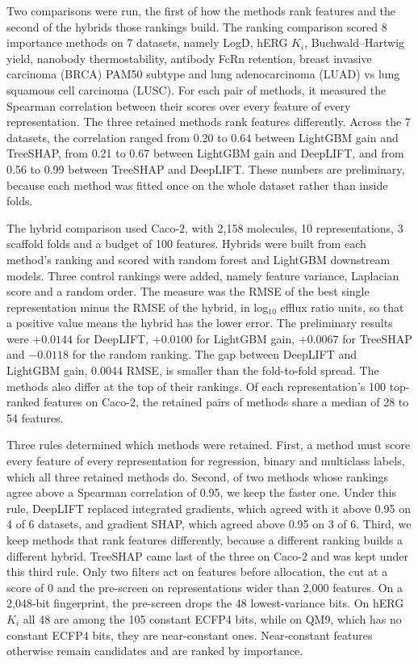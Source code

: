 Two comparisons were run, the first of how the methods rank features and the second of the hybrids those rankings build. The ranking comparison scored 8 importance methods on 7 datasets, namely LogD, hERG $K_i$, Buchwald--Hartwig yield, nanobody thermostability, antibody FcRn retention, breast invasive carcinoma (BRCA) PAM50 subtype and lung adenocarcinoma (LUAD) vs lung squamous cell carcinoma (LUSC). For each pair of methods, it measured the Spearman correlation between their scores over every feature of every representation. The three retained methods rank features differently. Across the 7 datasets, the correlation ranged from 0.20 to 0.64 between LightGBM gain and TreeSHAP, from 0.21 to 0.67 between LightGBM gain and DeepLIFT, and from 0.56 to 0.99 between TreeSHAP and DeepLIFT. These numbers are preliminary, because each method was fitted once on the whole dataset rather than inside folds.

The hybrid comparison used Caco-2, with 2,158 molecules, 10 representations, 3 scaffold folds and a budget of 100 features. Hybrids were built from each method's ranking and scored with random forest and LightGBM downstream models. Three control rankings were added, namely feature variance, Laplacian score and a random order. The measure was the RMSE of the best single representation minus the RMSE of the hybrid, in log$_{10}$ efflux ratio units, so that a positive value means the hybrid has the lower error. The preliminary results were $+0.0144$ for DeepLIFT, $+0.0100$ for LightGBM gain, $+0.0067$ for TreeSHAP and $-0.0118$ for the random ranking. The gap between DeepLIFT and LightGBM gain, 0.0044 RMSE, is smaller than the fold-to-fold spread. The methods also differ at the top of their rankings. Of each representation's 100 top-ranked features on Caco-2, the retained pairs of methods share a median of 28 to 54 features.

Three rules determined which methods were retained. First, a method must score every feature of every representation for regression, binary and multiclass labels, which all three retained methods do. Second, of two methods whose rankings agree above a Spearman correlation of 0.95, we keep the faster one. Under this rule, DeepLIFT replaced integrated gradients, which agreed with it above 0.95 on 4 of 6 datasets, and gradient SHAP, which agreed above 0.95 on 3 of 6. Third, we keep methods that rank features differently, because a different ranking builds a different hybrid. TreeSHAP came last of the three on Caco-2 and was kept under this third rule. Only two filters act on features before allocation, the cut at a score of 0 and the pre-screen on representations wider than 2,000 features. On a 2,048-bit fingerprint, the pre-screen drops the 48 lowest-variance bits. On hERG $K_i$ all 48 are among the 105 constant ECFP4 bits, while on QM9, which has no constant ECFP4 bits, they are near-constant ones. Near-constant features otherwise remain candidates and are ranked by importance.

